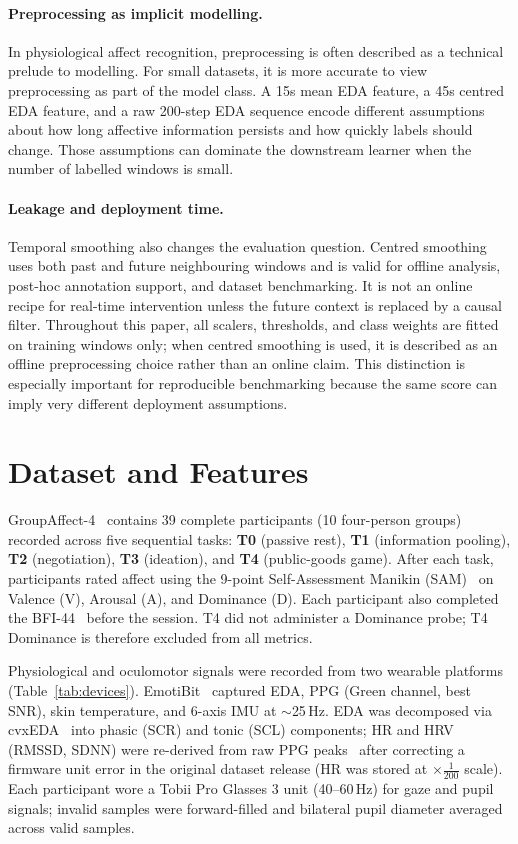 \documentclass[sigconf,review,anonymous]{acmart}
\begin{document}
\paragraph{Preprocessing as implicit modelling.}
In physiological affect recognition, preprocessing is often described as a
technical prelude to modelling.
For small datasets, it is more accurate to view preprocessing as part of the
model class.
A 15s mean EDA feature, a 45s centred EDA feature, and a raw 200-step EDA
sequence encode different assumptions about how long affective information
persists and how quickly labels should change.
Those assumptions can dominate the downstream learner when the number of
labelled windows is small.

\paragraph{Leakage and deployment time.}
Temporal smoothing also changes the evaluation question.
Centred smoothing uses both past and future neighbouring windows and is valid
for offline analysis, post-hoc annotation support, and dataset benchmarking.
It is not an online recipe for real-time intervention unless the future context
is replaced by a causal filter.
Throughout this paper, all scalers, thresholds, and class weights are fitted on
training windows only; when centred smoothing is used, it is described as an
offline preprocessing choice rather than an online claim.
This distinction is especially important for reproducible benchmarking because
the same score can imply very different deployment assumptions.

\section{Dataset and Features}
\label{sec:dataset}

GroupAffect-4~\cite{groupaffect4} contains 39 complete participants
(10 four-person groups) recorded across five sequential tasks:
\textbf{T0} (passive rest), \textbf{T1} (information pooling),
\textbf{T2} (negotiation), \textbf{T3} (ideation), and
\textbf{T4} (public-goods game).
After each task, participants rated affect using the 9-point
Self-Assessment Manikin (SAM)~\cite{bradley1994sam} on Valence (V),
Arousal (A), and Dominance (D).
Each participant also completed the BFI-44~\cite{john1999bigfive}
before the session.
T4 did not administer a Dominance probe; T4 Dominance is therefore
excluded from all metrics.

Physiological and oculomotor signals were recorded from two wearable platforms
(Table~\ref{tab:devices}).
EmotiBit~\cite{makowski2021neurokit2} captured EDA, PPG (Green channel, best
SNR), skin temperature, and 6-axis IMU at $\sim$25\,Hz.
EDA was decomposed via cvxEDA~\cite{greco2016cvxeda} into phasic (SCR) and tonic
(SCL) components; HR and HRV (RMSSD, SDNN) were re-derived from raw PPG
peaks~\cite{elgendi2013systolic} after correcting a firmware unit
error in the original dataset release
(HR was stored at $\times\!\tfrac{1}{200}$ scale).
Each participant wore a Tobii Pro Glasses 3 unit (40--60\,Hz) for gaze and
pupil signals; invalid samples were forward-filled and bilateral pupil diameter
averaged across valid samples.
\end{document}
